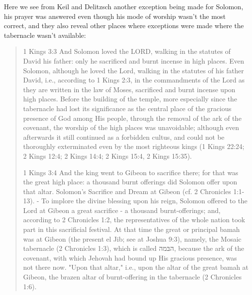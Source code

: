 \documentclass[11pt]{article}
\begin{document}
Here we see from Keil and Delitzsch another exception being made for Solomon, his prayer was answered even though his mode of worship wasn't the most correct, and they also reveal other places where exceptions were made where the tabernacle wasn't available:
\begin{quote}
1 Kings 3:3
And Solomon loved the LORD, walking in the statutes of David his father: only he sacrificed and burnt incense in high places.
Even Solomon, although he loved the Lord, walking in the statutes of his father David, i.e., according to 1 Kings 2:3, in the commandments of the Lord as they are written in the law of Moses, sacrificed and burnt incense upon high places. Before the building of the temple, more especially since the tabernacle had lost its significance as the central place of the gracious presence of God among His people, through the removal of the ark of the covenant, the worship of the high places was unavoidable; although even afterwards it still continued as a forbidden cultus, and could not be thoroughly exterminated even by the most righteous kings (1 Kings 22:24; 2 Kings 12:4; 2 Kings 14:4; 2 Kings 15:4, 2 Kings 15:35). 

1 Kings 3:4
And the king went to Gibeon to sacrifice there; for that was the great high place: a thousand burnt offerings did Solomon offer upon that altar.
Solomon's Sacrifice and Dream at Gibeon (cf. 2 Chronicles 1:1-13). - To implore the divine blessing upon his reign, Solomon offered to the Lord at Gibeon a great sacrifice - a thousand burnt-offerings; and, according to 2 Chronicles 1:2, the representatives of the whole nation took part in this sacrificial festival. At that time the great or principal bamah was at Gibeon (the present el Jib; see at Joshua 9:3), namely, the Mosaic tabernacle (2 Chronicles 1:3), which is called  הבּמה, because the ark of the covenant, with which Jehovah had bound up His gracious presence, was not there now. "Upon that altar," i.e., upon the altar of the great bamah at Gibeon, the brazen altar of burnt-offering in the tabernacle (2 Chronicles 1:6).
\end{quote}
\end{document}
